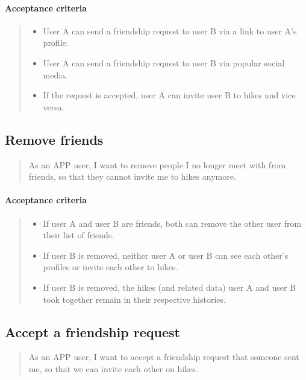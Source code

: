 \paragraph*{Acceptance criteria}
\begin{quote}
\begin{itemize}
    \item User A can send a friendship request to user B via a link to user A's profile.
    \item User A can send a friendship request to user B via popular social media.
    \item If the request is accepted, user A can invite user B to hikes and vice versa.
\end{itemize}
\end{quote}

\subsection{Remove friends}\label{US:friends-remove}
\begin{quote}
As an APP user, I want to remove people I no longer meet with from friends, so that they cannot invite me to hikes anymore.
\end{quote}

\paragraph*{Acceptance criteria}
\begin{quote}
\begin{itemize}
    \item If user A and user B are friends, both can remove the other user from their list of friends.
    \item If user B is removed, neither user A or user B can see each other's profiles or invite each other to hikes.
    \item If user B is removed, the hikes (and related data) user A and user B took together remain in their respective histories.
\end{itemize}
\end{quote}

\subsection{Accept a friendship request}\label{US:friends-accept}
\begin{quote}
As an APP user, I want to accept a friendship request that someone sent me, so that we can invite each other on hikes.
\end{quote}

